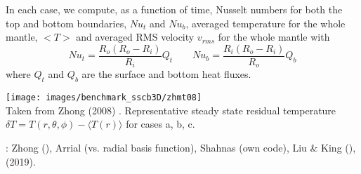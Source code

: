 

In each case, we compute, as a function of time, Nusselt 
numbers for both the top and bottom boundaries, $Nu_t$ and $Nu_b$, 
averaged temperature for
the whole mantle, $<T>$ and averaged RMS velocity $v_{rms}$ for the whole mantle
with
\[
Nu_t=\frac{R_o(R_o-R_i)}{R_i} Q_t
\quad\quad
Nu_b=\frac{R_i(R_o-R_i)}{R_o} Q_b
\]
where $Q_t$ and $Q_b$ are the surface and bottom heat fluxes.

\begin{center}
\texttt{[image: images/benchmark\_sscb3D/zhmt08]}\\
{\captionfont Taken from Zhong \etal (2008) \cite{zhmt08}. 
Representative steady state residual temperature 
$\delta T = T(r,\theta,\phi)-\langle T(r) \rangle$ for cases a, b, c.}
\end{center}


\Literature: Zhong \etal \cite{zhmt08} (\citcoms), Arrial \etal \cite{arfw14}
(\citcoms vs. radial basis function), Shahnas \etal \cite{shpe15} (own code), 
Liu \& King \cite{liki19} (\aspect),  (2019).





